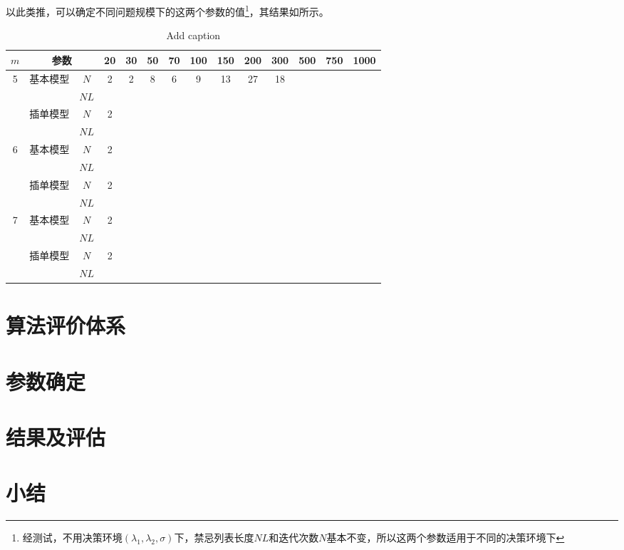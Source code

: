 以此类推，可以确定不同问题规模下的这两个参数的值\footnote{经测试，不用决策环境$(\lambda_1, \lambda_2, \sigma)$下，禁忌列表长度$NL$和迭代次数$N$基本不变，所以这两个参数适用于不同的决策环境下}，其结果如所示。
\begin{table}[htbp]
  \centering
  \caption{Add caption}
    \begin{tabular}{cccccccccccccc}
    \toprule
    $m $    & \multicolumn{2}{c}{参数} & 20    & 30    & 50    & 70    & 100   & 150   & 200   & 300   & 500   & 750   & 1000 \\
    \midrule
    \multirow{4}[0]{*}{5} & \multirow{2}[0]{*}{基本模型} & $N$    & 2     & 2     & 8     & 6     & 9     & 13    & 27    & 18    &       &       &  \\
          &       & $NL$    &       &       &       &       &       &       &       &       &       &       &  \\
          & \multirow{2}[0]{*}{插单模型} & $N$    & 2     &       &       &       &       &       &       &       &       &       &  \\
          &       & $NL$    &       &       &       &       &       &       &       &       &       &       &  \\
    \multirow{4}[0]{*}{6} & \multirow{2}[0]{*}{基本模型} & $N$    & 2     &       &       &       &       &       &       &       &       &       &  \\
          &       & $NL$    &       &       &       &       &       &       &       &       &       &       &  \\
          & \multirow{2}[0]{*}{插单模型} & $N$    & 2     &       &       &       &       &       &       &       &       &       &  \\
          &       & $NL$    &       &       &       &       &       &       &       &       &       &       &  \\
    \multirow{4}[0]{*}{7} & \multirow{2}[0]{*}{基本模型} & $N$    & 2     &       &       &       &       &       &       &       &       &       &  \\
          &       & $NL$    &       &       &       &       &       &       &       &       &       &       &  \\
          & \multirow{2}[0]{*}{插单模型} & $N$    & 2     &       &       &       &       &       &       &       &       &       &  \\
          &       & $NL$    &       &       &       &       &       &       &       &       &       &       &  \\
    \bottomrule
    \end{tabular}%
  \label{tab:addlabel}%
\end{table}%


\section{算法评价体系}


\section{参数确定}

\section{结果及评估}

\section{小结}